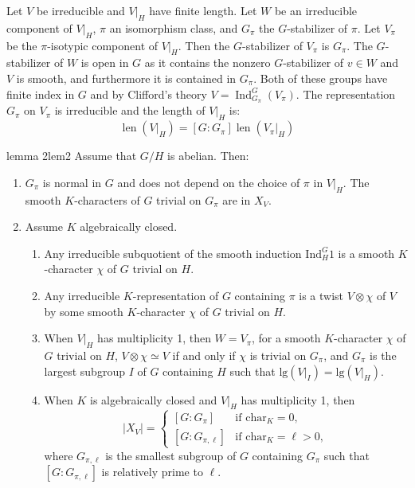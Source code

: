 \documentclass{article}
\newcommand{\len}{{\operatorname{len}}}
\newcommand{\Ind}{{\operatorname{Ind}}}
\begin{document}
Let $V$ be irreducible and $V|_H$ have finite length. Let $W$ be an irreducible component of $V|_H$, $\pi$ an
isomorphism class, and $G_\pi$ the $G$-stabilizer of $\pi$. Let $V_\pi$ be the $\pi$-isotypic component of
$V|_H$. Then the $G$-stabilizer of $V_\pi$ is $G_\pi$. The $G$-stabilizer of $W$ is open in $G$ as it contains
the nonzero $G$-stabilizer of $v\in W$ and $V$ is smooth, and furthermore it is contained in $G_\pi$. Both of
these groups have finite index in $G$ and by Clifford's theory $V = \Ind_{G_\pi}^G(V_\pi)$. The representation
$G_\pi$ on $V_\pi$ is irreducible and the length of $V|_H$ is:
\[
  \len(V|_H) = [G:G_\pi]\len(V_\pi|_H)
\]
\begin{lem}{lemma 2}{lem2}
  Assume that \(G/H\) is abelian. Then:
  \begin{enumerate}
  \item \(G_{\pi}\) is normal in \(G\) and does not depend on the choice of \(\pi\) in \(V|_{H}\). The smooth
    \(K\)-characters of \(G\) trivial on \(G_{\pi}\) are in \(X_V\).
  \item Assume \(K\) algebraically closed.
  \begin{enumerate}
  \item Any irreducible subquotient of the smooth induction \(\mathrm{Ind}_H^G 1\) is a smooth \(K\)-character \(\chi\) of \(G\) trivial on \(H\).
  \item Any irreducible \(K\)-representation of \(G\) containing \(\pi\) is a twist \(V \otimes \chi\) of
    \(V\) by some smooth \(K\)-character \(\chi\) of \(G\) trivial on \(H\).
  \item When \(V|_H\) has multiplicity 1, then \(W = V_{\pi}\), for a smooth \(K\)-character \(\chi\) of \(G\) trivial on \(H\), \(V \otimes \chi \simeq V\) if and only if \(\chi\) is trivial on \(G_{\pi}\), and \(G_{\pi}\) is the largest subgroup \(I\) of \(G\) containing \(H\) such that \(\mathrm{lg}(V|_I) = \mathrm{lg}(V|_H)\).
  \item When \(K\) is algebraically closed and \(V|_H\) has multiplicity 1, then
  \[
    |X_V| = \begin{cases} [G:G_{\pi}] & \text{if } \mathrm{char}_K = 0, \\ [G:G_{\pi,\ell}] & \text{if
    } \mathrm{char}_K = \ell > 0, \end{cases}
  \]
  where \(G_{\pi,\ell}\) is the smallest subgroup of \(G\) containing \(G_{\pi}\) such that \([G:G_{\pi,\ell}]\) is relatively prime to \(\ell\).
  \end{enumerate}
  \end{enumerate}
\end{lem}
\end{document}
